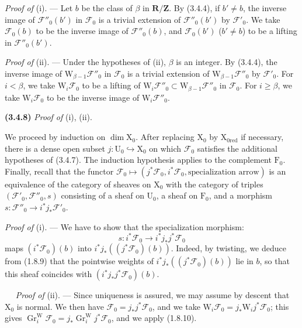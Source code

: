 \documentclass[11pt,leqno]{article}
\newcommand{\Page}[1]{\ifvmode\noindent\else\unskip\ \fi{\footnotesize\textcolor{gray}{[p.\,#1]}}\ \ignorespaces}
\begin{document}
\textit{Proof of} (i). — Let \(b\) be the class of \(\beta\) in \(\mathbf R/\mathbf Z\). By (3.4.4), if \(b'\ne b\), the inverse image of \(\mathscr F''_0(b')\) in \(\mathscr F_0\) is a trivial extension of \(\mathscr F''_0(b')\) by \(\mathscr F'_0\). We take \(\mathscr F_0(b)\) to be the inverse image of \(\mathscr F''_0(b)\), and \(\mathscr F_0(b')\) (\(b'\ne b\)) to be a lifting in \(\mathscr F''_0(b')\).

\textit{Proof of} (ii). — Under the hypotheses of (ii), \(\beta\) is an integer. By (3.4.4), the inverse image of \(\mathrm W_{\beta-1}\mathscr F''_0\) in \(\mathscr F_0\) is a trivial extension of \(\mathrm W_{\beta-1}\mathscr F''_0\) by \(\mathscr F'_0\). For \(i<\beta\), we take \(\mathrm W_i\mathscr F_0\) to be a lifting of \(\mathrm W_i\mathscr F''_0\subset\mathrm W_{\beta-1}\mathscr F''_0\) in \(\mathscr F_0\). For \(i\geq\beta\), we take \(\mathrm W_i\mathscr F_0\) to be the inverse image of \(\mathrm W_i\mathscr F''_0\).

\textbf{(3.4.8)} \textit{Proof of} (i), (ii).

We proceed by induction on \(\dim\mathrm X_0\). After replacing \(\mathrm X_0\) by \(\mathrm X_{0\mathrm{red}}\) if necessary, there is a dense open subset \(j:\mathrm U_0\hookrightarrow\mathrm X_0\)  on which \(\mathscr F_0\) satisfies the additional hypotheses of (3.4.7). The induction hypothesis applies to the complement \(\mathrm F_0\). Finally, recall that the functor \(\mathscr F_0\mapsto(j^*\mathscr F_0,i^*\mathscr F_0,\text{specialization arrow})\) is an equivalence of the category of sheaves on \(\mathrm X_0\) with the category of triples \((\mathscr F'_0,\mathscr F''_0,s)\) consisting of a sheaf on \(\mathrm U_0\), a sheaf on \(\mathrm F_0\), and a morphism \(s:\mathscr F''_0\to i^*j_*\mathscr F'_0\).

\textit{Proof of} (i). — We have to show that the specialization morphism:
\[
s:i^*\mathscr F_0\to i^*j_*j^*\mathscr F_0
\]
maps \((i^*\mathscr F_0)(b)\) into \(i^*j_*((j^*\mathscr F_0)(b))\). Indeed, by twisting, we deduce from (1.8.9) that the pointwise weights of \(i^*j_*((j^*\mathscr F_0)(b))\) lie in \(b\), so that this sheaf coincides with \((i^*j_*j^*\mathscr F_0)(b)\).

\Page{210}
\textit{Proof of} (ii). — Since uniqueness is assured, we may assume by descent that \(\mathrm X_0\) is normal. We then have \(\mathscr F_0=j_*j^*\mathscr F_0\), and we take \(\mathrm W_i\mathscr F_0=j_*\mathrm W_i j^*\mathscr F_0\); this gives \(\operatorname{Gr}_i^{\mathrm W}\mathscr F_0=j_*\operatorname{Gr}_i^{\mathrm W}j^*\mathscr F_0\), and we apply (1.8.10).
\end{document}
